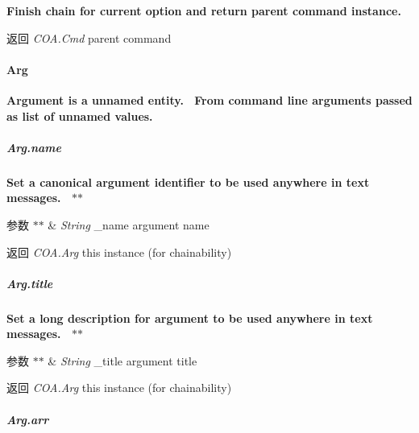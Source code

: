 {\bfseries {\bfseries {\bfseries {\bfseries {\bfseries {\bfseries  Finish chain for current option and return parent command instance.~\newline
 {\bfseries \begin{DoxyReturn}{返回}
{\itshape C\+O\+A.\+Cmd} {\ttfamily parent} command
\end{DoxyReturn}
\paragraph*{Arg}}}}}}}}

{\bfseries {\bfseries {\bfseries {\bfseries {\bfseries {\bfseries {\bfseries  Argument is a unnamed entity.~\newline
 From command line arguments passed as list of unnamed values.}}}}}}}

{\bfseries {\bfseries {\bfseries {\bfseries {\bfseries {\bfseries {\bfseries \subparagraph*{Arg.\+name}}}}}}}}

{\bfseries {\bfseries {\bfseries {\bfseries {\bfseries {\bfseries {\bfseries  Set a canonical argument identifier to be used anywhere in text messages.~\newline
 $\ast$$\ast$
\begin{DoxyParams}{参数}
{\em $\ast$$\ast$} & {\itshape String} {\ttfamily \+\_\+name} argument name~\newline
 {\bfseries }\\
\hline
\end{DoxyParams}
\begin{DoxyReturn}{返回}
{\bfseries } {\itshape C\+O\+A.\+Arg} {\ttfamily this} instance (for chainability)
\end{DoxyReturn}
\subparagraph*{Arg.\+title}}}}}}}}

{\bfseries {\bfseries {\bfseries {\bfseries {\bfseries {\bfseries {\bfseries  Set a long description for argument to be used anywhere in text messages.~\newline
 $\ast$$\ast$
\begin{DoxyParams}{参数}
{\em $\ast$$\ast$} & {\itshape String} {\ttfamily \+\_\+title} argument title~\newline
 {\bfseries }\\
\hline
\end{DoxyParams}
\begin{DoxyReturn}{返回}
{\bfseries } {\itshape C\+O\+A.\+Arg} {\ttfamily this} instance (for chainability)
\end{DoxyReturn}
\subparagraph*{Arg.\+arr}}}}}}}}

